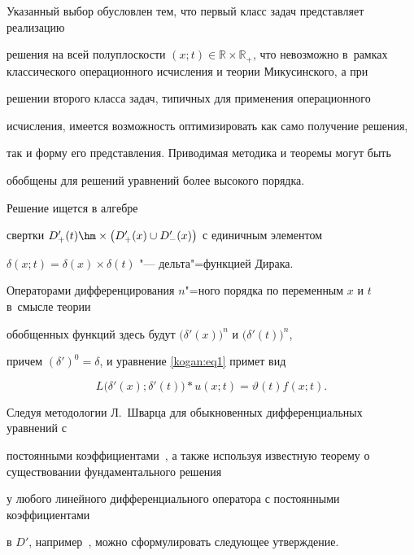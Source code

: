 Указанный выбор обусловлен тем, что первый класс задач представляет реализацию 

решения на всей полуплоскости $(x;t)\in \mathbb R\times \mathbb R_+$, что невозможно в~рамках классического операционного исчисления и теории Микусинского, а при 

решении второго класса задач, типичных для применения операционного 

исчисления, имеется возможность оптимизировать как само получение решения, 

так и форму его представления. Приводимая методика и теоремы могут быть 

обобщены для решений уравнений более высокого порядка.



\smallskip



 Решение ищется в алгебре 

свертки $D'_{+} (t)\hm \times \bigl(D'_+ (x)\cup D'_- (x)\bigr)$ с единичным элементом 

$\delta (x;t)=\delta (x)\times \delta (t)$ "--- дельта"=функцией Дирака. 

Операторами дифференцирования $n$"=ного порядка по переменным $x$ и $t$ в~смысле теории 

обобщенных функций здесь будут $\bigl(\delta'(x)\bigr)^n$ и $\bigl(\delta'(t)\bigr)^n$, 

причем $(\delta')^0=\delta$, и уравнение \eqref{kogan:eq1} примет вид

\begin{equation}

\label{kogan:eq6}

L\big(\delta'(x);\delta'(t) \big)\ast u(x;t)=\vartheta(t) f(x;t).

\end{equation}



Следуя методологии Л.~Шварца для обыкновенных дифференциальных уравнений с 

постоянными коэффициентами~\cite{kogan:bib9}, а также используя известную теорему о существовании фундаментального решения 

у любого линейного дифференциального оператора с постоянными коэффициентами 

в $D'$, например~\cite{kogan:bib17}, можно сформулировать следующее утверждение.



